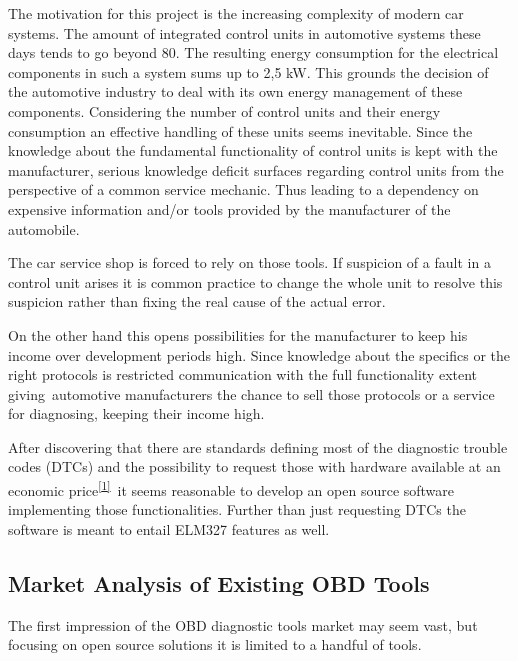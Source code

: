 {The motivation for this project is the increasing complexity of modern
car systems. The amount of integrated control units in automotive
systems these days tends to go beyond 80. The resulting energy
consumption for the electrical components in such a system sums up to
2,5 kW. This grounds the decision of the automotive industry to deal
with }{its }{own energy management of these components. Considering the
number of control units and their energy consumption an effective
handling of these units }{seems inevitable}{. Since the knowledge about
the fundamental functionality of control units is kept with the
manufacturer, serious knowledge deficit surfaces regarding control units
from the perspective of a common service mechanic. Thus leading to a
dependency on expensive information and/or tools provided by the
manufacturer of the automobile.}

{The car service shop is forced to rely on those tools. If suspicion of
a fault in a control unit arises it is common practice to change the
whole unit to resolve this suspicion rather than fixing the real cause
of the actual error.}

{On the other hand this opens possibilities for the manufacturer to keep
his income over development periods high. Since knowledge about the
specifics or the right protocols is restricted communication with the
full functionality extent giving}{~automotive manufacturers the chance
to sell those protocols or a service for diagnosing, keeping their
income high.}

{After discovering that there are standards defining most of the
diagnostic trouble codes (DTCs) and the possibility to request those
with hardware available at an economic
price}\textsuperscript{\protect\hyperlink{ftnt1}{{[}1{]}}}{~it seems
reasonable to develop an open source software implementing those
functio}{n}{alities. Further than just requesting DTCs the software is
meant to entail ELM327 features as well. }

\hypertarget{h.ku3zfbnqma3q}{\subsection{\texorpdfstring{{Market
Analysis of Existing OBD
Tools}}{Market Analysis of Existing OBD Tools}}\label{h.ku3zfbnqma3q}}

{}

{The first impression of the OBD diagnostic tools market may seem vast,
but focusing on open source solutions it is limited to a handful of
tools.}

